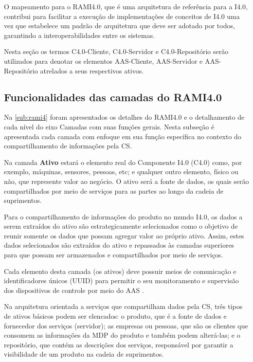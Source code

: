 	O mapeamento para o RAMI4.0, que é uma arquitetura de referência para a I4.0, contribui para facilitar a execução de implementações de conceitos de I4.0 uma vez que estabelece um padrão de arquitetura que deve ser adotado por todos, garantindo a interoperabilidades entre os sistemas.
	
	Nesta seção os termos C4.0-Cliente, C4.0-Servidor e C4.0-Repositório serão utilizados para denotar os elementos AAS-Cliente, AAS-Servidor e AAS-Repositório atrelados a seus respectivos ativos.

\subsection{Funcionalidades das camadas do RAMI4.0}

	Na \autoref{sub:rami4} foram apresentados os detalhes do RAMI4.0 e o detalhamento de cada nível do eixo Camadas com suas funções gerais. Nesta subseção é apresentada cada camada com enfoque em sua função específica no contexto do compartilhamento de informações pela CS.

	Na camada \textbf{Ativo} estará o elemento real do Componente I4.0 (C4.0) como, por exemplo, máquinas, sensores, pessoas, etc; e qualquer outro elemento, físico ou não, que represente valor ao negócio. O ativo será a fonte de dados, os quais serão compartilhados por meio de serviços para as partes ao longo da cadeia de suprimentos.
	
	Para o compartilhamento de informações do produto no mundo I4.0, os dados a serem extraídos do ativo são estrategicamente selecionados como o objetivo de reunir somente os dados que possam agregar valor ao próprio ativo. Assim, estes dados selecionados são extraídos do ativo e repassados às camadas superiores para que possam ser armazenados e compartilhados por meio de serviços.
	
	Cada elemento desta camada (os ativos) deve possuir meios de comunicação e identificadores únicos (UUID) para permitir o seu monitoramento e supervisão dos dispositivos de controle por meio do AAS \cite{adolphs2015rami}.
	
	Na arquitetura orientada a serviços que compartilham dados pela CS, três tipos de ativos básicos podem ser elencados: o produto, que é a fonte de dados e fornecedor dos serviços (servidor); as empresas ou pessoas, que são os clientes que consomem as informações da MDP do produto e também podem alterá-las; e o repositório, que contém as descrições dos serviços, responsável por garantir a visibilidade de um produto na cadeia de suprimentos.
	
